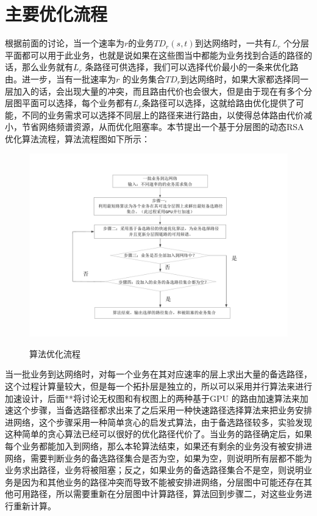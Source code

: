 \section{主要优化流程}
  根据前面的讨论，当一个速率为$r$的业务$TD_r(s,t)$到达网络时，一共有$L_r$ 个分层平面都可以用于此业务，也就是说如果在这些图当中都能为业务找到合适的路径的话，那么业务就有$L_r$ 条路径可供选择，我们可以选择代价最小的一条来优化路由。进一步，当有一批速率为$r$ 的业务集合$TD_r$到达网络时，如果大家都选择同一层加入的话，会出现大量的冲突，而且路由代价也会很大，但是由于现在有多个分层图平面可以选择，每个业务都有$L_r$条路径可以选择，这就给路由优化提供了可能，不同的业务需求可以选择不同层上的路径来进行路由，以使得总体路由代价减小，节省网络频谱资源，从而优化阻塞率。本节提出一个基于分层图的动态RSA优化算法流程，算法流程图如下所示：
 \begin{figure}
\setlength{\belowcaptionskip}{-0.5cm}
  \begin{center}
    {\includegraphics[width=1 \textwidth]{figures/bbprocess.pdf}}
    \end{center}
  \caption{{\footnotesize{算法优化流程}}}
  \label{bblayer}
\end{figure}
 当一批业务到达网络时，对每一个业务在其对应速率的层上求出大量的备选路径，这个过程计算量较大，但是每一个拓扑层是独立的，所以可以采用并行算法来进行加速设计，后面**将讨论无权图和有权图上的两种基于GPU 的路由加速算法来加速这个步骤，当备选路径都求出来了之后采用一种快速路径选择算法来把业务安排进网络，这个步骤采用一种简单贪心的启发式算法，由于备选路径较多，实验发现这种简单的贪心算法已经可以很好的优化路径代价了。当业务的路径确定后，如果每个业务都能加入到网络，那么本轮算法结束，如果还有剩余的业务没有被安排进网络，需要判断业务的备选路径集合是否为空，如果为空，则说明所有层都不能为业务求出路径，业务将被阻塞；反之，如果业务的备选路径集合不是空，则说明业务是因为和其他业务的路径冲突而导致不能被安排进网络，分层图中可能还存在其他可用路径，所以需要重新在分层图中计算路径，算法回到步骤二，对这些业务进行重新计算。

